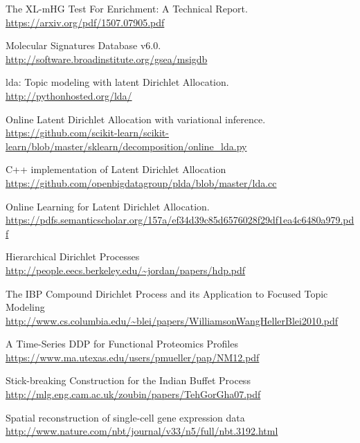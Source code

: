 \documentclass[11pt]{article}
\begin{document}
\begin{thebibliography}{9}
        The XL-mHG Test For Enrichment: A Technical Report.
        \url{https://arxiv.org/pdf/1507.07905.pdf}
         
        Molecular Signatures Database v6.0.
        \url{http://software.broadinstitute.org/gsea/msigdb}
         
        lda: Topic modeling with latent Dirichlet Allocation.
        \url{http://pythonhosted.org/lda/}

        Online Latent Dirichlet Allocation with variational inference.
        \url{https://github.com/scikit-learn/scikit-learn/blob/master/sklearn/decomposition/online_lda.py}

        C++ implementation of Latent Dirichlet Allocation
        \url{https://github.com/openbigdatagroup/plda/blob/master/lda.cc}

        Online Learning for Latent Dirichlet Allocation.
        \url{https://pdfs.semanticscholar.org/157a/ef34d39c85d6576028f29df1ea4c6480a979.pdf}

        Hierarchical Dirichlet Processes
        \url{http://people.eecs.berkeley.edu/~jordan/papers/hdp.pdf}

        The IBP Compound Dirichlet Process and its Application to Focused Topic Modeling
        \url{http://www.cs.columbia.edu/~blei/papers/WilliamsonWangHellerBlei2010.pdf}

        A Time-Series DDP for Functional Proteomics Profiles
        \url{https://www.ma.utexas.edu/users/pmueller/pap/NM12.pdf}

        Stick-breaking Construction for the Indian Buffet Process
        \url{http://mlg.eng.cam.ac.uk/zoubin/papers/TehGorGha07.pdf}

        Spatial reconstruction of single-cell gene expression data
        \url{http://www.nature.com/nbt/journal/v33/n5/full/nbt.3192.html}


\end{thebibliography}
\end{document}
